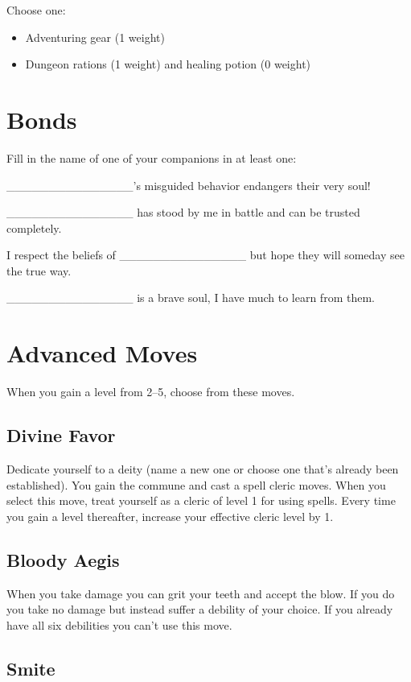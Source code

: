  Choose one:
\begin{itemize}
\item Adventuring gear (1 weight)
\item Dungeon rations (1 weight) and healing potion (0 weight)

\end{itemize}
\section{Bonds}


 Fill in the name of one of your companions in at least one:


 \_\_\_\_\_\_\_\_\_\_\_\_\_\_\_'s misguided behavior endangers their very soul!


 \_\_\_\_\_\_\_\_\_\_\_\_\_\_\_ has stood by me in battle and can be trusted completely.


 I respect the beliefs of \_\_\_\_\_\_\_\_\_\_\_\_\_\_\_ but hope they will someday see the true way.


 \_\_\_\_\_\_\_\_\_\_\_\_\_\_\_ is a brave soul, I have much to learn from them.
\section{Advanced Moves}


 {\Large When you gain a level from 2--5, choose from these moves.}
\subsection{Divine Favor}


 Dedicate yourself to a deity (name a new one or choose one that's already been established). You gain the commune and cast a spell cleric moves. When you select this move, treat yourself as a cleric of level 1 for using spells. Every time you gain a level thereafter, increase your effective cleric level by 1.
\subsection{Bloody Aegis}


 When you take damage you can grit your teeth and accept the blow. If you do you take no damage but instead suffer a debility of your choice. If you already have all six debilities you can't use this move.
\subsection{Smite}


